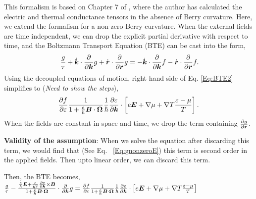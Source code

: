 \documentclass{report}
\renewcommand\vec[1]{\ensuremath\boldsymbol{#1}} %
\begin{document}
This formalism is based on Chapter 7 of \cite{book:ZimanSolidState}, where the author has calculated the electric and thermal conductance tensors in the absence of Berry curvature. Here, we extend the formalism for a non-zero Berry curvature. When the external fields are time independent, we can drop the explicit partial derivative with respect to time, and the Boltzmann Transport Equation (BTE) can be cast into the form,
\begin{equation}~\label{Eq:BTE2}
	\frac{g}{\tau} + \dot{\vec{k}}\cdot\frac{\partial}{\partial \vec{k}} g + \dot{\vec{r}}\cdot\frac{\partial}{\partial \vec{r}} g = -\dot{\vec{k}}\cdot\frac{\partial}{\partial \vec{k}}f - \dot{\vec{r}}\cdot\frac{\partial}{\partial \vec{r}}f.
\end{equation}
Using the decoupled equations of motion, right hand side of Eq. \eqref{Eq:BTE2} simplifies to (\textit{Need to show the steps}),
$$\frac{\partial f}{\partial \varepsilon}\frac{1}{1 + \frac{e}{\hbar} \vec{B}\cdot\vec{\Omega}}
\frac{1}{\hbar} \frac{\partial \varepsilon}{\partial \vec{k}}\cdot\left[e \vec{E} + \nabla{\mu} + \nabla T \frac{\varepsilon - \mu}{T}\right] .
$$
When the fields are constant in space and time, we drop the term containing $\frac{\partial{g}}{\partial \vec{r}}$.

\textbf{Validity of the assumption}: When we solve the equation after discarding this term, we would find that (See Eq. ~\eqref{Eq:gnonzeroE}) this term is second order in the applied fields. Then upto linear order, we can discard this term.

Then, the BTE becomes,
$\frac{g}{\tau} -\frac{\frac{e}{\hbar} \vec{E} +\frac{e}{\hbar^2} \frac{\partial \varepsilon}{\partial \vec{k}} \times \vec{B}}{1 + \frac{e}{\hbar} \vec{B} \cdot \vec{\Omega}} \cdot\frac{\partial}{\partial \vec{k}} g = \frac{\partial f}{\partial \varepsilon}\frac{1}{1 + \frac{e}{\hbar} \vec{B} \cdot \vec{\Omega}}
\frac{1}{\hbar} \frac{\partial \varepsilon}{\partial \vec{k}}\cdot\left[e \vec{E} + \nabla{\mu} + \nabla T \frac{\varepsilon - \mu}{T}\right] $

\end{document}
